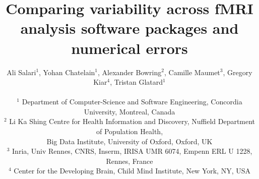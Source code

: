 \documentclass[11pt,onecolumn]{article}
\begin{document}
\newcommand{\fslspm}{FSL-SPM\xspace}
\newcommand{\fslafni}{FSL-AFNI\xspace}
\newcommand{\afnispm}{AFNI-SPM\xspace}
\newcommand{\tristan}[1]{\color{orange}\textbf{From Tristan:} #1\color{black}\xspace}
\newcommand{\camille}[1]{\color{blue}\textbf{From Camille:} #1\color{black}\xspace}
\newcommand{\ali}[2]{\color{green}\textbf{Ali:} #1\color{black}\xspace}
\newcommand{\discuss}[1]{\uwave{#1}}
\newcommand{\gk}[1]{\color{purple}#1 \textbf{-GK}\color{black}\xspace}
\newcommand{\yohan}[1]{\color{cyan!75!black} \textbf{Yohan:} #1\color{black}\xspace}
\newcommand{\yohanmod}[1]{\color{cyan!75!black} \sout{#1}\color{black}\xspace}


\title{Comparing variability across fMRI analysis software packages and numerical errors}

\author{Ali Salari$^1$, Yohan Chatelain$^1$, Alexander Bowring$^2$, Camille Maumet$^3$, Gregory Kiar$^4$, Tristan Glatard$^1$\\
  \vspace*{0.1cm}\\
  $^1$ Department of Computer-Science and Software Engineering, Concordia University, Montreal, Canada\\
  $^2$ Li Ka Shing Centre for Health Information and Discovery, Nuffield Department of Population Health,\\ Big Data Institute, University of Oxford, Oxford, UK\\
  $^3$ Inria, Univ Rennes, CNRS, Inserm, IRISA UMR 6074, Empenn ERL U 1228, Rennes, France\\
  $^4$ Center for the Developing Brain, Child Mind Institute, New York, NY, USA}
\end{document}
